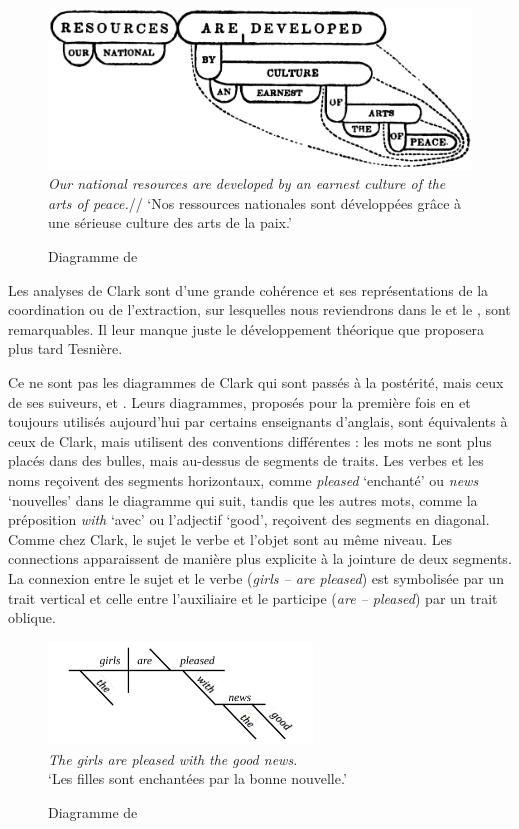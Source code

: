 {    \begin{figure}[H]
    \caption{\label{fig:}Diagramme de \citet[17]{Clark1847}}
    \includegraphics[width=.75\textwidth]{figures/Clark1847.png}\medskip\\
    \small\textit{Our national resources are developed by an earnest culture of the arts of peace.}//
    ‘Nos ressources nationales sont développées grâce à une sérieuse culture des arts de la paix.’
    \end{figure}

    Les analyses de Clark sont d’une grande cohérence et ses représentations de la coordination ou de l’extraction, sur lesquelles nous reviendrons dans le  et le , sont remarquables. Il leur manque juste le développement théorique que proposera plus tard Tesnière.

    Ce ne sont pas les diagrammes de Clark qui sont passés à la postérité, mais ceux de ses suiveurs,  et . Leurs diagrammes, proposés pour la première fois en \citeyear{ReedKellogg1877} et toujours utilisés aujourd’hui par certains enseignants d’anglais, sont équivalents à ceux de Clark, mais utilisent des conventions différentes : les mots ne sont plus placés dans des bulles, mais au-dessus de segments de traits. Les verbes et les noms reçoivent des segments horizontaux, comme \textit{pleased} ‘enchanté’ ou \textit{news} ‘nouvelles’ dans le diagramme qui suit, tandis que les autres mots, comme la préposition \textit{with} ‘avec’ ou l’adjectif ‘good’, reçoivent des segments en diagonal. Comme chez Clark, le sujet le verbe et l’objet sont au même niveau. Les connections apparaissent de manière plus explicite à la jointure de deux segments. La connexion entre le sujet et le verbe (\textit{girls – are pleased}) est symbolisée par un trait vertical et celle entre l’auxiliaire et le participe (\textit{are – pleased}) par un trait oblique.

    \begin{figure}[H]
    \includegraphics[width=7cm]{figures/ReedKellog}\medskip\\
    \textit{The girls are pleased with the good news.}\\
    ‘Les filles sont enchantées par la bonne nouvelle.’\\
    \caption{Diagramme de \citet{ReedKellogg1877}}
    \end{figure}

}
